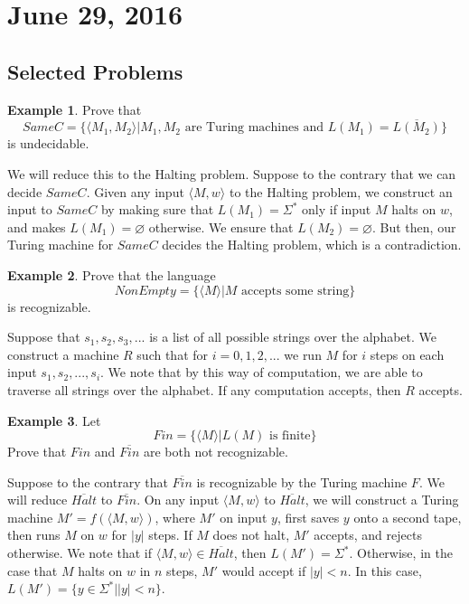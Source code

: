 \documentclass[11pt]{article}
\let\emptyset\varnothing
\theoremstyle{plain} %
\theoremstyle{definition}
\theoremstyle{example}
\newtheorem*{example}{Example}
\theoremstyle{remark}
\begin{document}
\section{June 29, 2016}
\subsection{Selected Problems}

\begin{example}
Prove that 
$$SameC = \{\langle M_1, M_2\rangle | M_1, M_2 \text{ are Turing machines and } L(M_1) = \overline{L(M_2)}\}$$
is undecidable.
\end{example}

We will reduce this to the Halting problem. Suppose to the contrary that we can decide $SameC$. Given any input $\langle M, w \rangle$ to the Halting problem, we construct an input to $SameC$ by making sure that $L(M_1) = \Sigma^*$ only if input $M$ halts on $w$, and makes $L(M_1) = \emptyset$ otherwise. We ensure that $L(M_2) = \emptyset$. But then, our Turing machine for $SameC$ decides the Halting problem, which is a contradiction.

\begin{example}
Prove that the language $$NonEmpty = \{ \langle M \rangle|M \text{ accepts some string}\}$$ is recognizable.
\end{example}

Suppose that $s_1, s_2, s_3,...$ is a list of all possible strings over the alphabet. We construct a machine $R$ such that for $i = 0, 1, 2, ...$ we run $M$ for $i$ steps on each input $s_1, s_2, ...,s_i$. We note that by this way of computation, we are able to traverse all strings over the alphabet. If any computation accepts, then $R$ accepts. 

\begin{example}
Let $$Fin = \{\langle M \rangle | L(M) \text{ is finite}\}$$
Prove that $Fin$ and $\overline{Fin}$ are both not recognizable. 
\end{example}

Suppose to the contrary that $\overline{Fin}$ is recognizable by the Turing machine $F$. We will reduce $\overline{Halt}$ to $\overline{Fin}$. On any input $\langle M , w \rangle $ to $\overline{Halt}$, we will construct a Turing machine $M' = f(\langle M, w\rangle)$, where $M'$ on input $y$, first saves $y$ onto a second tape, then runs $M$ on $w$ for $|y|$ steps. If $M$ does not halt, $M'$ accepts, and rejects otherwise. We note that if $\langle M, w\rangle \in \overline{Halt}$, then $L(M') = \Sigma^*$. Otherwise, in the case that $M$ halts on $w$ in $n$ steps, $M'$ would accept if $|y| < n$. In this case, $L(M') = \{y \in \Sigma^* | |y|< n\}$. 
\end{document}

